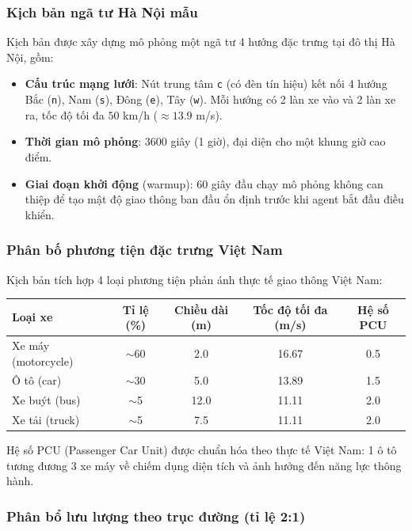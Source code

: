 \subsubsection{Kịch bản ngã tư Hà Nội mẫu}

Kịch bản được xây dựng mô phỏng một ngã tư 4 hướng đặc trưng tại đô thị Hà Nội, gồm:

\begin{itemize}
    \item \textbf{Cấu trúc mạng lưới}: Nút trung tâm \texttt{c} (có đèn tín hiệu) kết nối 4 hướng Bắc (\texttt{n}), Nam (\texttt{s}), Đông (\texttt{e}), Tây (\texttt{w}). Mỗi hướng có 2 làn xe vào và 2 làn xe ra, tốc độ tối đa $50$ km/h ($\approx 13.9$ m/s).
    \item \textbf{Thời gian mô phỏng}: 3600 giây (1 giờ), đại diện cho một khung giờ cao điểm.
    \item \textbf{Giai đoạn khởi động} (warmup): 60 giây đầu chạy mô phỏng không can thiệp để tạo mật độ giao thông ban đầu ổn định trước khi agent bắt đầu điều khiển.
\end{itemize}

\subsubsection{Phân bố phương tiện đặc trưng Việt Nam}

Kịch bản tích hợp 4 loại phương tiện phản ánh thực tế giao thông Việt Nam:

\begin{center}
\begin{tabular}{|l|c|c|c|c|}
\hline
\textbf{Loại xe} & \textbf{Tỉ lệ (\%)} & \textbf{Chiều dài (m)} & \textbf{Tốc độ tối đa (m/s)} & \textbf{Hệ số PCU} \\
\hline
Xe máy (motorcycle) & $\sim$60 & 2.0 & 16.67 & 0.5 \\
Ô tô (car) & $\sim$30 & 5.0 & 13.89 & 1.5 \\
Xe buýt (bus) & $\sim$5 & 12.0 & 11.11 & 2.0 \\
Xe tải (truck) & $\sim$5 & 7.5 & 11.11 & 2.0 \\
\hline
\end{tabular}
\end{center}

\vspace{6pt}
Hệ số PCU (Passenger Car Unit) được chuẩn hóa theo thực tế Việt Nam: 1 ô tô tương đương 3 xe máy về chiếm dụng diện tích và ảnh hưởng đến năng lực thông hành.

\subsubsection{Phân bổ lưu lượng theo trục đường (tỉ lệ 2:1)}

